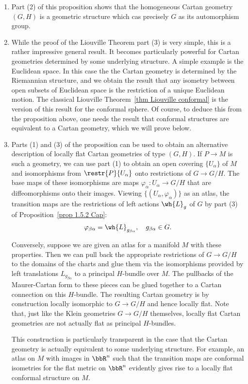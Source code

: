 \begin{rem}\label{rem 1.5.2 Cap}
    \begin{enumerate}
        \item Part (2) of this proposition shows that the homogeneous Cartan geometry $(G,H)$ is a geometric structure which cas precisely $G$ as its automorphism group.
        \item While the proof of the Liouville Theorem part (3) is very simple, this is a rather impressive general result. It becomes particularly powerful for Cartan geometries determined by some underlying structure. A simple example is the Euclidean space. In this case the the Cartan geometry is determined by the Riemannian structure, and we obtain the result that any isometry between open subsets of Euclidean space is the restriction of a unique Euclidean motion. The classical Liouville Theorem~\ref{thm Liouville conformal} is the version of this result for the conformal sphere. Of course, to deduce this from the proposition above, one needs the result that conformal structures are equivalent to a Cartan geometry, which we will prove below.
        
        \item Parts (1) and (3) of the proposition can be used to obtain an alternative description of locally flat Cartan geometries of type $(G,H)$. If $P\to M$ is such a geometry, we can use part (1) to obtain an open covering $\{U_\alpha\}$ of $M$ and isomorphisms from $\restr{P}{U_\alpha}$ onto restrictions of $G\to G\slash H$. The base maps of these isomorphisms are maps $\varphi_\alpha:U_\alpha\to G\slash H$ that are diffeomorphisms onto their images. Viewing $\{(U_\alpha,\varphi_\alpha)\}$ as an atlas, the transition maps are the restrictions of left actions $\wh{L}_g$ of $G$ by part (3) of Proposition~\ref{prop 1.5.2 Cap}:
        \[\varphi_{\beta\alpha}=\wh{L}_{g_{\beta\alpha}},\quad g_{\beta\alpha}\in G.\]
        
        Conversely, suppose we are given an atlas for a manifold $M$ with these properties. Then we can pull back the appropriate restrictions of $G\to G\slash H$ to the domains of the charts and glue them via the isomorphisms provided by left translations $L_{g_{\beta\alpha}}$ to a principal $H$-bundle over $M$. The pullbacks of the Maurer-Cartan form to these pieces can be glued together to a Cartan connection on this $H$-bundle. The resulting Cartan geometry is by construction locally isomorphic to $G\to G\slash H$ and hence locally flat. Note that, just like the Klein geometries $G\to G\slash H$ themselves, locally flat Cartan geometries are not actually flat as principal $H$-bundles.

        This construction is particularly transparent in the case that the Cartan geometry is actually equivalent to some underlying structure. For example, an atlas on $M$ with images in $\bbR^n$ such that the transition maps are conformal isometries for the flat metric on $\bbR^n$ evidently gives rise to a locally flat conformal structure on $M$.
    \end{enumerate}
\end{rem}








